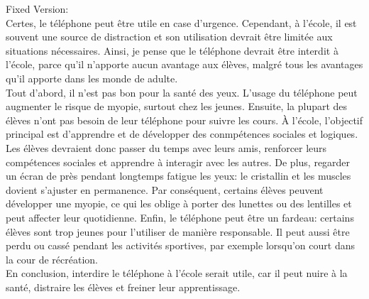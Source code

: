 \documentclass{book}
\begin{document}
            Fixed Version: \\
            Certes, le téléphone peut être utile en case d'urgence. Cependant, à l'école, il est souvent une source de distraction et son utilisation devrait être limitée aux situations nécessaires.
            Ainsi, je pense que le téléphone devrait être interdit à l'école, parce qu'il n'apporte aucun avantage aux élèves, malgré tous les avantages qu'il apporte dans les monde de adulte. \\
            Tout d'abord, il n'est pas bon pour la santé des yeux. L'usage du téléphone peut augmenter le risque de myopie, surtout chez les jeunes.
            Ensuite, la plupart des élèves n'ont pas besoin de leur téléphone pour suivre les cours. À l'école, l'objectif principal est d'apprendre et de développer des conmpétences sociales et logiques. 
            Les élèves devraient donc passer du temps avec leurs amis, renforcer leurs compétences sociales et apprendre à interagir avec les autres.
            De plus, regarder un écran de près pendant longtemps fatigue les yeux: le cristallin et les muscles dovient s'ajuster en permanence. Par conséquent, certains élèves peuvent développer une myopie,
            ce qui les oblige à porter des lunettes ou des lentilles et peut affecter leur quotidienne.
            Enfin, le téléphone peut être un fardeau: certains élèves sont trop jeunes pour l'utiliser de manière responsable.
            Il peut aussi être perdu ou cassé pendant les activités sportives, par exemple lorsqu'on court dans la cour de récréation. \\
            En conclusion, interdire le téléphone à l'école serait utile, car il peut nuire à la santé, distraire les élèves et freiner leur apprentissage. \\
\end{document}
